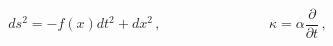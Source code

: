 \begin{equation}
ds^{2}=-f\left( x\right) dt^{2}+dx^{2}\,,\,\ \ \ \ \ \ \ \ \ \ \ \ \ \ \ \ \
\ \ \ \ \ \ \ \ \ \ \ \ \ \ \ \ \ \kappa =\alpha \frac{\partial }{\partial t}%
\,,  \label{sol1}
\end{equation}

